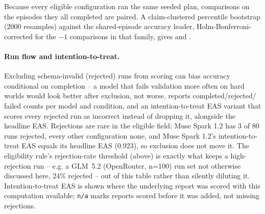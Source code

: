 \documentclass{article}
\begin{document}
Because every eligible configuration ran the same seeded plan, comparisons on the
\CommonEpisodes{} episodes they all completed are paired. A claim-clustered percentile
bootstrap (2000 resamples) against the shared-episode accuracy leader, Holm-Bonferroni-corrected for
the \FieldSize{}$-1$ comparisons in that family, gives  and
.

\begin{table}
\centering
\caption{Accuracy difference vs. the shared-episode accuracy leader, Holm-Bonferroni corrected
(the confirmatory family;  gives the full, uncorrected,
exploratory pairwise matrix).}
\label{tab:pairwise-vsleader}
\small

\end{table}

\paragraph{Run flow and intention-to-treat.} Excluding schema-invalid
(rejected) runs from scoring can bias accuracy conditional on completion --
a model that fails validation more often on hard worlds would look better
after exclusion, not worse.  reports completed/rejected/
failed counts per model and condition, and an intention-to-treat EAS variant
that scores every rejected run as incorrect instead of dropping it, alongside
the headline EAS. Rejections are rare in the eligible field: Muse Spark 1.2
has 3 of 80 runs rejected, every other configuration none, and Muse Spark 1.2's
intention-to-treat EAS equals its headline EAS (0.923), so exclusion does not
move it. The eligibility rule's rejection-rate threshold (above) is exactly
what keeps a high-rejection run -- e.g. a GLM~5.2 (OpenRouter, n=100) run set
not otherwise discussed here, 24\% rejected -- out of this table rather than
silently diluting it. Intention-to-treat EAS is shown where the
underlying report was
scored with this computation available; \texttt{n/a} marks reports scored
before it was added, not missing rejections.

\begin{table}[h]
\centering
\caption{Per-condition run flow (completed/rejected/failed) and headline vs.
intention-to-treat EAS, for the \FieldSize{} field-eligible configurations.}
\label{tab:run-flow}
\small
\resizebox{\linewidth}{!}{}
\end{table}
\end{document}
